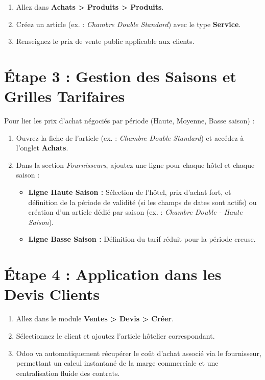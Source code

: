 \documentclass[11pt,a4paper]{report}
\begin{document}
\begin{enumerate}
    \item Allez dans \textbf{Achats > Produits > Produits}.
    \item Créez un article (ex. : \textit{Chambre Double Standard}) avec le type \textbf{Service}.
    \item Renseignez le prix de vente public applicable aux clients.
\end{enumerate}


\section{Étape 3 : Gestion des Saisons et Grilles Tarifaires}

Pour lier les prix d'achat négociés par période (Haute, Moyenne, Basse saison) :

\begin{enumerate}
    \item Ouvrez la fiche de l'article (ex. : \textit{Chambre Double Standard}) et accédez à l'onglet \textbf{Achats}.
    \item Dans la section \textit{Fournisseurs}, ajoutez une ligne pour chaque hôtel et chaque saison :
    \begin{itemize}
        \item \textbf{Ligne Haute Saison :} Sélection de l'hôtel, prix d'achat fort, et définition de la période de validité (si les champs de dates sont actifs) ou création d'un article dédié par saison (ex. : \textit{Chambre Double - Haute Saison}).
        \item \textbf{Ligne Basse Saison :} Définition du tarif réduit pour la période creuse.
    \end{itemize}
\end{enumerate}


\section{Étape 4 : Application dans les Devis Clients}

\begin{enumerate}
    \item Allez dans le module \textbf{Ventes > Devis > Créer}.
    \item Sélectionnez le client et ajoutez l'article hôtelier correspondant.
    \item Odoo va automatiquement récupérer le coût d'achat associé via le fournisseur, permettant un calcul instantané de la marge commerciale et une centralisation fluide des contrats.
\end{enumerate}
\end{document}
